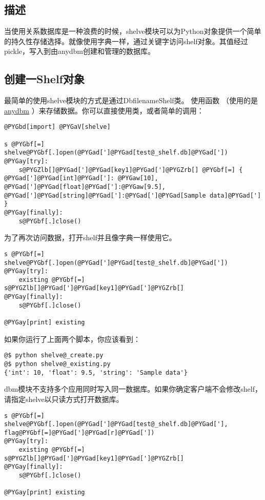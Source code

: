 \documentclass[letterpaper,10pt,english]{manual}
\begin{document}
\subsection{描述}

当使用关系数据库是一种浪费的时候，shelve模块可以为Python对象提供一个简单的持久性存储选择。就像使用字典一样，通过关键字访问shelf对象。其值经过pickle，写入到由anydbm创建和管理的数据库。


\subsection{创建一Shelf对象}

最简单的使用shelve模块的方式是通过DbfilenameShelf类。 使用函数  （使用的是 \href{http://docs.python.org/lib/module-anydbm.html}{anydbm} ）来存储数据。你可以直接使用类，或者简单的调用：

\begin{Verbatim}[commandchars=@\[\]]
@PYGbd[import] @PYGaV[shelve]

s @PYGbf[=] shelve@PYGbf[.]open(@PYGad[']@PYGad[test@_shelf.db]@PYGad['])
@PYGay[try]:
    s@PYGZlb[]@PYGad[']@PYGad[key1]@PYGad[']@PYGZrb[] @PYGbf[=] { @PYGad[']@PYGad[int]@PYGad[']: @PYGaw[10], @PYGad[']@PYGad[float]@PYGad[']:@PYGaw[9.5], @PYGad[']@PYGad[string]@PYGad[']:@PYGad[']@PYGad[Sample data]@PYGad['] }
@PYGay[finally]:
    s@PYGbf[.]close()
\end{Verbatim}

为了再次访问数据，打开shelf并且像字典一样使用它。

\begin{Verbatim}[commandchars=@\[\]]
s @PYGbf[=] shelve@PYGbf[.]open(@PYGad[']@PYGad[test@_shelf.db]@PYGad['])
@PYGay[try]:
    existing @PYGbf[=] s@PYGZlb[]@PYGad[']@PYGad[key1]@PYGad[']@PYGZrb[]
@PYGay[finally]:
    s@PYGbf[.]close()

@PYGay[print] existing
\end{Verbatim}

如果你运行了上面两个脚本，你应该看到：

\begin{Verbatim}[commandchars=@\[\]]
@$ python shelve@_create.py
@$ python shelve@_existing.py
{'int': 10, 'float': 9.5, 'string': 'Sample data'}
\end{Verbatim}

dbm模块不支持多个应用同时写入同一数据库。如果你确定客户端不会修改shelf， 请指定shelve以只读方式打开数据库。

\begin{Verbatim}[commandchars=@\[\]]
s @PYGbf[=] shelve@PYGbf[.]open(@PYGad[']@PYGad[test@_shelf.db]@PYGad['], flag@PYGbf[=]@PYGad[']@PYGad[r]@PYGad['])
@PYGay[try]:
    existing @PYGbf[=] s@PYGZlb[]@PYGad[']@PYGad[key1]@PYGad[']@PYGZrb[]
@PYGay[finally]:
    s@PYGbf[.]close()

@PYGay[print] existing
\end{Verbatim}
\end{document}
